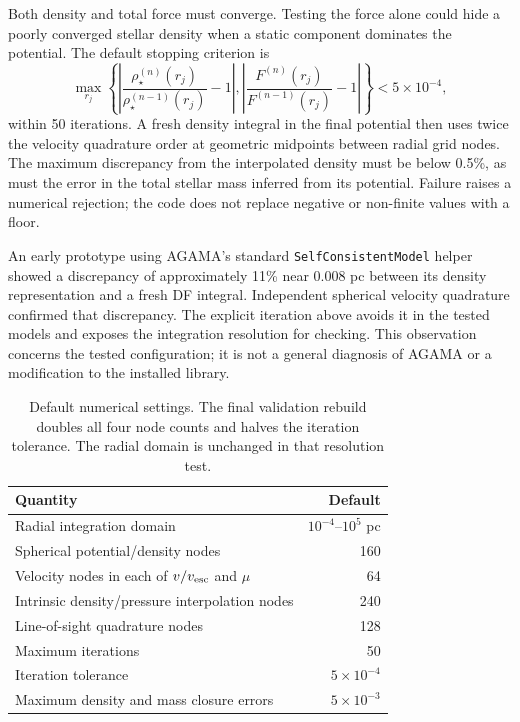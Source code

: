 \documentclass[11pt,a4paper]{article}
\begin{document}
Both density and total force must converge. Testing the force alone could
hide a poorly converged stellar density when a static component dominates
the potential. The default stopping criterion is
\begin{equation}
 \max_{r_j}\left\{
 \left|\frac{\rho^{(n)}_\star(r_j)}{\rho^{(n-1)}_\star(r_j)}-1\right|,
 \left|\frac{F^{(n)}(r_j)}{F^{(n-1)}(r_j)}-1\right|\right\}<5\times10^{-4},
 \label{eq:convergence}
\end{equation}
within 50 iterations. A fresh density integral in the final potential then
uses twice the velocity quadrature order at geometric midpoints between
radial grid nodes. The maximum discrepancy from the interpolated density
must be below 0.5\%, as must the error in the total stellar mass inferred
from its potential. Failure raises a numerical rejection; the code does not
replace negative or non-finite values with a floor.

An early prototype using AGAMA's standard \texttt{SelfConsistentModel} helper
showed a discrepancy of approximately 11\% near 0.008 pc between its density
representation and a fresh DF integral. Independent spherical velocity
quadrature confirmed that discrepancy. The explicit iteration above avoids
it in the tested models and exposes the integration resolution for checking.
This observation concerns the tested configuration; it is not a general
diagnosis of AGAMA or a modification to the installed library.

\begin{table}[htbp]
\centering\small
\caption{Default numerical settings. The final validation rebuild doubles all
four node counts and halves the iteration tolerance. The radial domain is
unchanged in that resolution test.}
\label{tab:numerics}
\begin{tabular}{lr}
\toprule
Quantity & Default\\
\midrule
Radial integration domain & $10^{-4}$--$10^5$ pc\\
Spherical potential/density nodes & 160\\
Velocity nodes in each of $v/v_{\rm esc}$ and $\mu$ & 64\\
Intrinsic density/pressure interpolation nodes & 240\\
Line-of-sight quadrature nodes & 128\\
Maximum iterations & 50\\
Iteration tolerance & $5\times10^{-4}$\\
Maximum density and mass closure errors & $5\times10^{-3}$\\
\bottomrule
\end{tabular}
\end{table}
\end{document}
